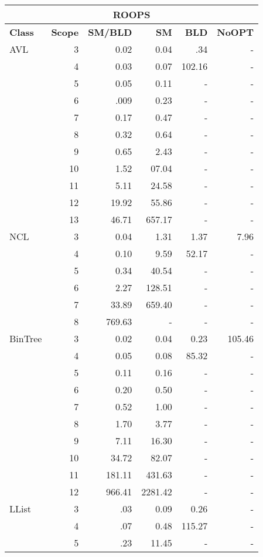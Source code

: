 \begin{table}
\scriptsize
\centering
\label{tab:results-obj1}
\begin{tabular}{ l r | r | r | r | r  }
  \toprule
  \multicolumn{6}{c}{\textbf{ROOPS}} \\
  \midrule 
  \textbf{Class} & \textbf{Scope} & \textbf{SM/BLD} & \textbf{SM}  & \textbf{BLD} & \textbf{NoOPT}  \\
  \midrule
  AVL
&	3	&	0.02	&	0.04	&	.34	&	-	\\
&	4	&	0.03	&	0.07	&	102.16	&	-	\\
&	5	&	0.05	&	0.11	&	-	&	-	\\
&	6	&	.009	&	0.23	&	-	&	-	\\
&	7	&	0.17	&	0.47	&	-	&	-	\\
&	8	&	0.32	&	0.64	&	-	&	-	\\
&	9	&	0.65	&	2.43	&	-	&	-	\\
&	10	&	1.52	&	07.04	&	-	&	-	\\
&	11	&	5.11	&	24.58	&	-	&	-	\\
&	12	&	19.92	&	55.86	&	-	&	-	\\
&	13	&	46.71	&	657.17	&	-	&	-	\\
  \midrule
  NCL
&	3	&	0.04	&	1.31	&	1.37	&	7.96	\\
&	4	&	0.10	&	9.59	&	52.17	&	-	\\
&	5	&	0.34	&	40.54	&	-	&	-	\\
&	6	&	2.27	&	128.51	&	-	&	-	\\
&	7	&	33.89	&	659.40	&	-	&	-	\\
&	8	&	769.63	&	-	&	-	&	-	\\
  \midrule
  BinTree
&	3	&	0.02	&	0.04	&	0.23	&	105.46	\\
&	4	&	0.05	&	0.08	&	85.32	&	-	\\
&	5	&	0.11	&	0.16	&	-	&	-	\\
&	6	&	0.20	&	0.50	&	-	&	-	\\
&	7	&	0.52	&	1.00	&	-	&	-	\\
&	8	&	1.70	&	3.77	&	-	&	-	\\
&	9	&	7.11	&	16.30	&	-	&	-	\\
&	10	&	34.72	&	82.07	&	-	&	-	\\
&	11	&	181.11	&	431.63	&	-	&	-	\\
&	12	&	966.41	&	2281.42	&	-	&	-	\\
  \midrule
  LList
&	3	&	.03	&	0.09	&	0.26	&	-	\\
&	4	&	.07	&	0.48	&	115.27	&	-	\\
&	5	&	.23	&	11.45	&	-	&	-	\\

\end{tabular}
\end{table}
